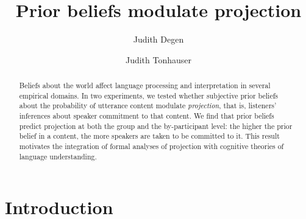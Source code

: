 \documentclass[OpenMind]{stjour}
\begin{document}
\title{Prior beliefs modulate projection}



\author[Judith Degen, Judith Tonhauser]
{Judith Degen 
\and Judith Tonhauser}









\begin{abstract}
Beliefs about the world affect language processing and interpretation in several empirical domains. In two experiments, we tested whether subjective prior beliefs about the probability of utterance content modulate \emph{projection}, that is, listeners' inferences about speaker commitment to that content. We find that prior beliefs predict projection at both the group and the by-participant level: the higher the prior belief in a content, the more speakers are taken to be committed to it. This result motivates the integration of formal analyses of projection with cognitive theories of language understanding.  
\end{abstract}

\section{Introduction}
\end{document}
